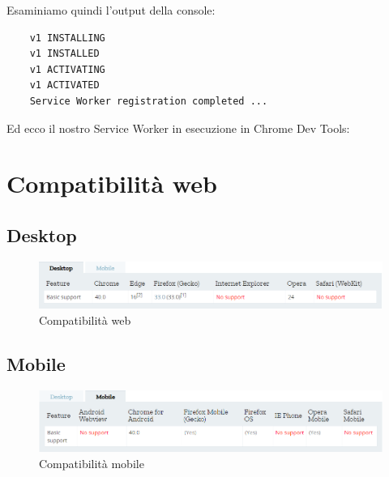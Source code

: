 \documentclass[italian]{article}
\begin{document}
Esaminiamo quindi l'output della console:
\begin{lstlisting}
	v1 INSTALLING 
	v1 INSTALLED
	v1 ACTIVATING
	v1 ACTIVATED
	Service Worker registration completed ...
\end{lstlisting}
Ed ecco il nostro Service Worker in esecuzione in Chrome Dev Tools:






\pagebreak
\section{Compatibilità web}
\subsection{Desktop}
\begin{figure}[h]
	\centering
	\includegraphics[width=1\linewidth]{CompWeb}
	\caption{Compatibilità web}
	\label{fig:Compatibilità web}
\end{figure}
\subsection{Mobile}
\begin{figure}[h]
	\centering
	\includegraphics[width=1\linewidth]{CompMobile}
	\caption{Compatibilità mobile}
	\label{fig:Compatibilità mobile}
\end{figure}
\end{document}
